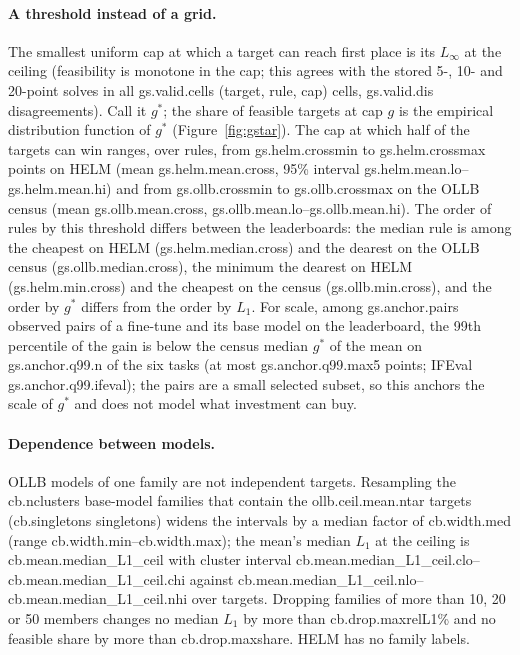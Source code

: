 \paragraph{A threshold instead of a grid.} The smallest uniform cap at which a target can reach first place is its $L_\infty$ at the ceiling (feasibility is monotone in the cap; this agrees with the stored 5-, 10- and 20-point solves in all \num{gs.valid.cells} (target, rule, cap) cells, \num{gs.valid.dis} disagreements). Call it $g^*$; the share of feasible targets at cap $g$ is the empirical distribution function of $g^*$ (Figure~\ref{fig:gstar}). The cap at which half of the targets can win ranges, over rules, from \num{gs.helm.crossmin} to \num{gs.helm.crossmax} points on HELM (mean \num{gs.helm.mean.cross}, 95\% interval \num{gs.helm.mean.lo}--\num{gs.helm.mean.hi}) and from \num{gs.ollb.crossmin} to \num{gs.ollb.crossmax} on the OLLB census (mean \num{gs.ollb.mean.cross}, \num{gs.ollb.mean.lo}--\num{gs.ollb.mean.hi}). The order of rules by this threshold differs between the leaderboards: the median rule is among the cheapest on HELM (\num{gs.helm.median.cross}) and the dearest on the OLLB census (\num{gs.ollb.median.cross}), the minimum the dearest on HELM (\num{gs.helm.min.cross}) and the cheapest on the census (\num{gs.ollb.min.cross}), and the order by $g^*$ differs from the order by $L_1$. For scale, among \num{gs.anchor.pairs} observed pairs of a fine-tune and its base model on the leaderboard, the 99th percentile of the gain is below the census median $g^*$ of the mean on \num{gs.anchor.q99.n} of the six tasks (at most \num{gs.anchor.q99.max5} points; IFEval \num{gs.anchor.q99.ifeval}); the pairs are a small selected subset, so this anchors the scale of $g^*$ and does not model what investment can buy.

\paragraph{Dependence between models.} OLLB models of one family are not independent targets. Resampling the \num{cb.nclusters} base-model families that contain the \num{ollb.ceil.mean.ntar} targets (\num{cb.singletons} singletons) widens the intervals by a median factor of \num{cb.width.med} (range \num{cb.width.min}--\num{cb.width.max}); the mean's median $L_1$ at the ceiling is \num{cb.mean.median_L1_ceil} with cluster interval \num{cb.mean.median_L1_ceil.clo}--\num{cb.mean.median_L1_ceil.chi} against \num{cb.mean.median_L1_ceil.nlo}--\num{cb.mean.median_L1_ceil.nhi} over targets. Dropping families of more than 10, 20 or 50 members changes no median $L_1$ by more than \num{cb.drop.maxrelL1}\% and no feasible share by more than \num{cb.drop.maxshare}. HELM has no family labels.


